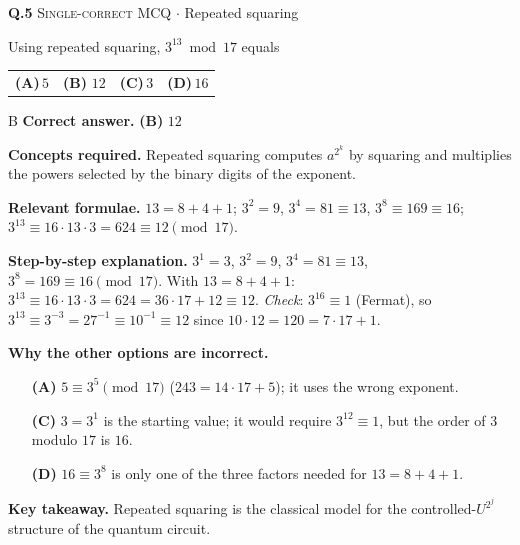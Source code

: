 \documentclass[11pt,a4paper]{article}
\newcommand{\optlabel}[1]{\textbf{(#1)}}
\newcommand{\correctlabel}[1]{\textcolor{okgreen}{\textbf{(#1)}\,\ding{51}}}
\newenvironment{qitem}[1]{\begin{list}{}{\setlength{\leftmargin}{3.3em}\setlength{\labelwidth}{3.1em}%
  \setlength{\labelsep}{0.2em}\setlength{\topsep}{3pt}\setlength{\parsep}{3pt}}\item[\textbf{Q.#1}\hfill]}{\end{list}}
\newcommand{\qsep}{\par\vspace{2pt}{\color{black!15}\hrule}\vspace{4pt}}
\newcommand{\qmeta}[2]{{\footnotesize\color{black!60}\textsc{#1} \;$\cdot$\; #2}\par}
\begin{document}
\begin{qitem}{5}
\qmeta{Single-correct MCQ}{Repeated squaring}
Using repeated squaring, $3^{13} \bmod 17$ equals
\par\smallskip\noindent\begin{tabularx}{\linewidth}{@{}*{4}{L}@{}}
\optlabel{A}\,$5$ & \correctlabel{B}\,$12$ & \optlabel{C}\,$3$ & \optlabel{D}\,$16$
\end{tabularx}
\end{qitem}
\begin{solbox}{B}
\textbf{\color{brand}Correct answer.} \textcolor{okgreen}{\textbf{(B)}} $12$

\textbf{\color{brand}Concepts required.} Repeated squaring computes $a^{2^k}$ by squaring and multiplies the powers selected by the binary digits of the exponent.

\textbf{\color{brand}Relevant formulae.} $13 = 8 + 4 + 1$; $3^2 = 9$, $3^4 = 81 \equiv 13$, $3^8 \equiv 169 \equiv 16$; $3^{13} \equiv 16\cdot13\cdot3 = 624 \equiv 12 \pmod{17}$.

\textbf{\color{brand}Step-by-step explanation.} $3^1 = 3$, $3^2 = 9$, $3^4 = 81 \equiv 13$, $3^8 = 169 \equiv 16 \pmod{17}$. With $13 = 8 + 4 + 1$:
$3^{13} \equiv 16\cdot13\cdot3 = 624 = 36\cdot17 + 12 \equiv 12$. \emph{Check}: $3^{16} \equiv 1$ (Fermat), so $3^{13} \equiv 3^{-3} = 27^{-1} \equiv 10^{-1} \equiv 12$
since $10\cdot12 = 120 = 7\cdot17 + 1$.

\textbf{\color{brand}Why the other options are incorrect.}
\begin{itemize}[leftmargin=2.4em, itemsep=1pt, topsep=2pt]
\item[\textbf{(A)}] $5 \equiv 3^5 \pmod{17}$ ($243 = 14\cdot17 + 5$); it uses the wrong exponent.
\item[\textbf{(C)}] $3 = 3^1$ is the starting value; it would require $3^{12} \equiv 1$, but the order of $3$ modulo $17$ is $16$.
\item[\textbf{(D)}] $16 \equiv 3^8$ is only one of the three factors needed for $13 = 8 + 4 + 1$.
\end{itemize}
\textbf{\color{brand}Key takeaway.} Repeated squaring is the classical model for the controlled-$U^{2^j}$ structure of the quantum circuit.
\end{solbox}
\qsep
\end{document}
